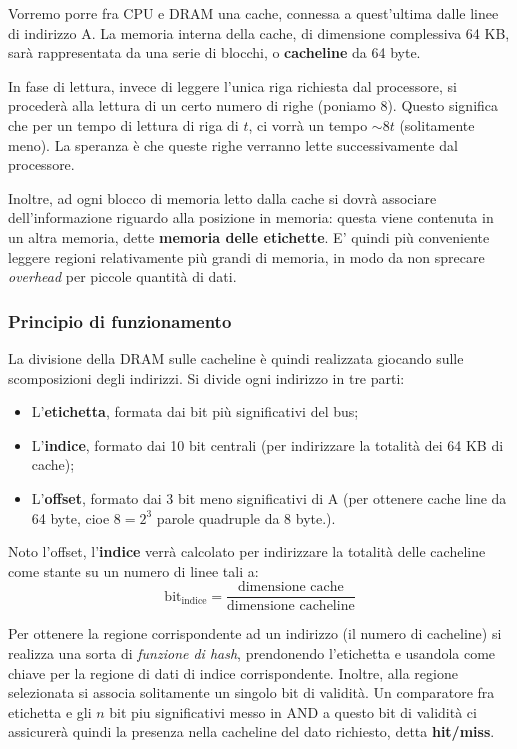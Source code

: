 \documentclass[a4paper,11pt]{article}
\begin{document}
Vorremo porre fra CPU e DRAM una cache, connessa a quest'ultima dalle linee di indirizzo A.
La memoria interna della cache, di dimensione complessiva 64 KB, sarà rappresentata da una serie di blocchi, o \textbf{cacheline} da 64 byte.

In fase di lettura, invece di leggere l'unica riga richiesta dal processore, si procederà alla lettura di un certo numero di righe (poniamo 8).
Questo significa che per un tempo di lettura di riga di $t$, ci vorrà un tempo $\sim 8t$ (solitamente meno).
La speranza è che queste righe verranno lette successivamente dal processore.

Inoltre, ad ogni blocco di memoria letto dalla cache si dovrà associare dell'informazione riguardo alla posizione in memoria: questa viene contenuta in un altra memoria, dette \textbf{memoria delle etichette}.
E' quindi più conveniente leggere regioni relativamente più grandi di memoria, in modo da non sprecare \textit{overhead} per piccole quantità di dati.

\subsubsection{Principio di funzionamento}
La divisione della DRAM sulle cacheline è quindi realizzata giocando sulle scomposizioni degli indirizzi.
Si divide ogni indirizzo in tre parti:
\begin{itemize}
	\item L'\textbf{etichetta}, formata dai bit più significativi del bus;
	\item L'\textbf{indice}, formato dai 10 bit centrali (per indirizzare la totalità dei 64 KB di cache);
	\item L'\textbf{offset}, formato dai 3 bit meno significativi di A (per ottenere cache line da 64 byte, cioe $8 = 2^3$ parole quadruple da 8 byte.). 
\end{itemize}

Noto l'offset, l'\textbf{indice} verrà calcolato per indirizzare la totalità delle cacheline come stante su un numero di linee tali a:
$$
\mathrm{bit}_{\mathrm{indice}} = \frac{\text{dimensione cache}}{\text{dimensione cacheline}}
$$

Per ottenere la regione corrispondente ad un indirizzo (il numero di cacheline) si realizza una sorta di \textit{funzione di hash}, prendonendo l'etichetta e usandola come chiave per la regione di dati di indice corrispondente.
Inoltre, alla regione selezionata si associa solitamente un singolo bit di validità.
Un comparatore fra etichetta e gli $n$ bit piu significativi messo in AND a questo bit di validità ci assicurerà quindi la presenza nella cacheline del dato richiesto, detta \textbf{hit/miss}.
\end{document}
